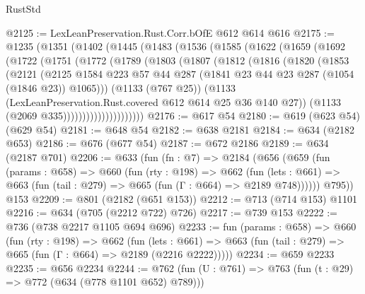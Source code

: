 \begin{lexlean}{RustStd}
\begin{coremodule}
@2125 := LexLeanPreservation.Rust.Corr.bOfE @612 @614 @616
@2175 := @1235
    (@1351
      (@1402
        (@1445
          (@1483
            (@1536
              (@1585
                (@1622
                  (@1659
                    (@1692
                      (@1722
                        (@1751
                          (@1772
                            (@1789
                              (@1803
                                (@1807
                                  (@1812
                                    (@1816
                                      (@1820
                                        (@1853
                                          (@2121
                                            (@2125
                                              @1584
                                              @223
                                              @57
                                              @44
                                              @287
                                              (@1841 @23 @44 @23 @287 (@1054 (@1846 @23)) @1065)))
                                          (@1133 (@767 @25))
                                          (@1133
                                            (LexLeanPreservation.Rust.covered
                                              @612
                                              @614
                                              @25
                                              @36
                                              @140
                                              @27))
                                          (@1133 (@2069 @335)))))))))))))))))))))
@2176 := @617 @54
@2180 := @619 (@623 @54) (@629 @54)
@2181 := @648 @54
@2182 := @638 @2181
@2184 := @634 (@2182 @653)
@2186 := @676 (@677 @54)
@2187 := @672 @2186
@2189 := @634 (@2187 @701)
@2206 := @633
    (fun (fn : @7) =>
    @2184
      (@656
        (@659
          (fun (params : @658) =>
          @660
            (fun (rty : @198) =>
            @662
              (fun (lets : @661) =>
              @663 (fun (tail : @279) => @665 (fun (Γ : @664) => @2189 @748))))))
        @795))
    @153
@2209 := @801 (@2182 (@651 @153))
@2212 := @713 (@714 @153) @1101
@2216 := @634 (@705 (@2212 @722) @726)
@2217 := @739 @153
@2222 := @736 (@738 @2217 @1105 @694 @696)
@2233 := fun (params : @658) =>
  @660
    (fun (rty : @198) =>
    @662
      (fun (lets : @661) =>
      @663 (fun (tail : @279) => @665 (fun (Γ : @664) => @2189 (@2216 @2222)))))
@2234 := @659 @2233
@2235 := @656 @2234
@2244 := @762 (fun (U : @761) => @763 (fun (t : @29) => @772 (@634 (@778 @1101 @652) @789)))

\end{coremodule}
\end{lexlean}
